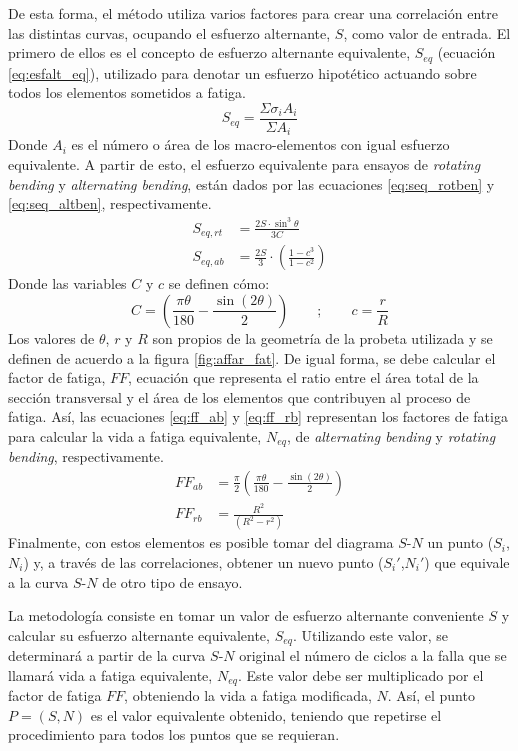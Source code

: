 De esta forma, el método utiliza varios factores para crear una correlación entre las distintas curvas, ocupando el esfuerzo alternante, $S$, como valor de entrada. El primero de ellos es el concepto de esfuerzo alternante equivalente, $S_{eq}$ (ecuación \ref{eq:esfalt_eq}), utilizado para denotar un esfuerzo hipotético actuando sobre todos los elementos sometidos a fatiga. 
\begin{equation}\label{eq:esfalt_eq}
	S_{eq} = \frac{\Sigma \sigma_i A_i}{\Sigma A_i}
\end{equation}
Donde $A_i$ es el número o área de los macro-elementos con igual esfuerzo equivalente. A partir de esto, el esfuerzo equivalente para ensayos de \textit{rotating bending} y \textit{alternating bending}, están dados por las ecuaciones \ref{eq:seq_rotben} y \ref{eq:seq_altben}, respectivamente. 
\begin{align}
	S_{eq,rt} &= \frac{2S\cdot \sin^3 \theta}{3C} \label{eq:seq_rotben}\\
	S_{eq,ab} &= \frac{2S}{3} \cdot \left(\frac{1-c^3}{1-c^2}\right) \label{eq:seq_altben}
\end{align}
Donde las variables $C$ y $c$ se definen cómo:
\begin{equation}
	C= \left(\frac{\pi\theta}{180} - \frac{\sin(2\theta)}{2}\right)\qquad ;\qquad c=\frac{r}{R}
\end{equation}
Los valores de $\theta$, $r$ y $R$ son propios de la geometría de la probeta utilizada y se definen de acuerdo a la figura \ref{fig:affar_fat}. De igual forma, se debe calcular el factor de fatiga, $FF$, ecuación que representa el ratio entre el área total de la sección transversal y el área de los elementos que contribuyen al proceso de fatiga. Así, las ecuaciones \ref{eq:ff_ab} y \ref{eq:ff_rb} representan los factores de fatiga para calcular la vida a fatiga equivalente, $N_{eq}$, de \textit{alternating bending} y \textit{rotating bending}, respectivamente.
\begin{align}
	FF_{ab} &= \frac{\pi}{2} \left(\frac{\pi\theta}{180} - \frac{\sin(2\theta)}{2}\right) \label{eq:ff_ab}\\		
	FF_{rb} &= \frac{R^2}{(R^2 - r^2)} \label{eq:ff_rb}
\end{align}
Finalmente, con estos elementos es posible tomar del diagrama $S$-$N$ un punto ($S_i$,$N_i$) y, a través de las correlaciones, obtener un nuevo punto ($S_i'$,$N_i'$) que equivale a la curva $S$-$N$ de otro tipo de ensayo.

La metodología consiste en tomar un valor de esfuerzo alternante conveniente $S$ y calcular su esfuerzo alternante equivalente, $S_{eq}$. Utilizando este valor, se determinará a partir de la curva $S$-$N$ original el número de ciclos a la falla que se llamará vida a fatiga equivalente, $N_{eq}$. Este valor debe ser multiplicado por el factor de fatiga $FF$, obteniendo la vida a fatiga modificada, $N$. Así, el punto $P=(S,N)$ es el valor equivalente obtenido, teniendo que repetirse el procedimiento para todos los puntos que se requieran.

